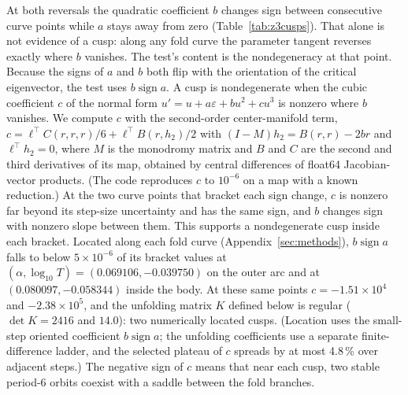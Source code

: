 \documentclass[11pt,letterpaper]{article}
\begin{document}
At both reversals the quadratic coefficient $b$ changes sign between consecutive curve points while $a$ stays away
from zero (Table~\ref{tab:z3cusps}). That alone is not evidence of a cusp: along any fold curve the parameter tangent
reverses exactly where $b$ vanishes. The test's content is the nondegeneracy at that point.
Because the signs of $a$ and $b$ both flip with the orientation of the critical eigenvector, the test uses
$b\operatorname{sign}a$. A cusp is nondegenerate when the cubic coefficient $c$ of the normal form
$u'=u+a\varepsilon+bu^2+cu^3$ is nonzero where $b$ vanishes. We compute $c$ with the second-order center-manifold
term, $c=\ell^\top C(r,r,r)/6+\ell^\top B(r,h_2)/2$ with $(I-M)h_2=B(r,r)-2br$ and $\ell^\top h_2=0$, where $M$ is
the monodromy matrix and $B$ and $C$ are the second and third derivatives of its map, obtained by central differences
of float64 Jacobian-vector products. (The code reproduces $c$ to $10^{-6}$ on a map with a known reduction.) At the two
curve points that bracket each sign change, $c$ is nonzero far beyond its step-size uncertainty and has the same sign,
and $b$ changes sign with nonzero slope between them. This supports a nondegenerate cusp inside each bracket. Located along each fold curve (Appendix~\ref{sec:methods}),
$b\operatorname{sign}a$ falls to below $5\times10^{-6}$ of its bracket values at $(\alpha,\log_{10}T)=(0.069106,-0.039750)$
on the outer arc and at $(0.080097,-0.058344)$ inside the body. At these same points $c=-1.51\times10^{4}$ and
$-2.38\times10^{5}$, and the unfolding matrix $K$ defined below is regular ($\det K=2416$ and $14.0$): two
numerically located cusps. (Location uses the small-step oriented coefficient $b\operatorname{sign}a$; the unfolding
coefficients use a separate finite-difference ladder, and the selected plateau of $c$ spreads by at most 4.8\,\% over
adjacent steps.) The
negative sign of $c$ means that near each cusp, two stable period-6 orbits coexist with a saddle between the fold
branches.
\end{document}
